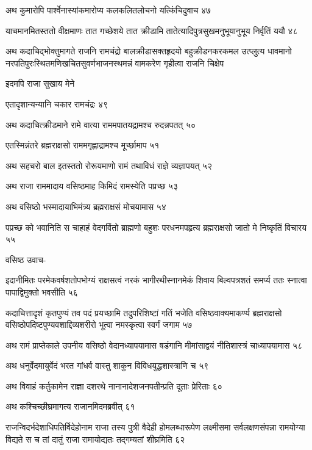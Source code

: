 अथ कुमारोपि पार्श्वेनास्यांकमारोप्य कलकलितलोचनो यत्किंचिदुवाच ४७

याचमानमितस्ततो वीक्षमाणः तात गच्छेशये तात क्रीडामि तातेत्यादिपुत्रसुखमनुभूयानुभूय
निर्वृतिं ययौ ४८

अथ कदाचिद्भोक्तुमागते राजनि रामचंद्रो बालक्रीडासक्तहृदयो बहुक्रीडनकरकमल उत्प्लुत्य
धावमानो नरपतिपुरःस्थितमणिखचितसुवर्णभाजनस्थमन्नं वामकरेण गृहीत्वा राजनि चिक्षेप

इदमपि राजा सुखाय मेने

एतादृशान्यन्यानि चकार रामचंद्रः ४९

अथ कदाचित्क्रीडमाने रामे वात्या राममपातयद्रामश्च रुदन्नपतत् ५०

एतस्मिन्नंतरे ब्रह्मराक्षसो राममगृह्णाद्रामश्च मूर्च्छामाप ५१

अथ सहचरो बाल इतस्ततो रोरूयमाणो रामं तथाविधं राज्ञे व्यज्ञापयत् ५२

अथ राजा राममादाय वसिष्ठमाह किमिदं रामस्येति पप्रच्छ ५३

अथ वसिष्ठो भस्मादायाभिमंत्र्य ब्रह्मराक्षसं मोचयामास ५४

पप्रच्छ को भवानिति स चाहाहं वेदगर्वितो ब्राह्मणो बहुशः परधनमपहृत्य ब्रह्मराक्षसो जातो
मे निष्कृतिं विचारय ५५

वसिष्ठ उवाच-

इदानीमितः परमेकवर्षशतोपभोग्यं राक्षसत्वं नरकं भागीरथीस्नानमेकं शिवाय बिल्वपत्रशतं
समर्प्य ततः स्नात्वा पापाद्विमुक्तो भवसीति ५६

कदाचित्तादृशं कृतपुण्यं तव पदं प्रयच्छामि तदुपरिशिष्टां गतिं भजेति वसिष्ठवाक्यमाकर्ण्य
ब्रह्मराक्षसो वसिष्ठोपदिष्टपुण्यवशाद्दिव्यशरीरो भूत्वा नमस्कृत्वा स्वर्गं जगाम ५७

अथ रामं प्राप्तेकाले उपनीय वसिष्ठो वेदानध्यापयामास षडंगानि मीमांसाद्वयं नीतिशास्त्रं
चाध्यापयामास ५८

अथ धनुर्वेदमायुर्वेदं भरत गांधर्व वास्तु शाकुन विविधयुद्धशास्त्राणि च ५९

अथ विवाहं कर्तुकामेन राज्ञा दशरथे नानानादेशजनपतीन्प्रति दूताः प्रेरिताः ६०

अथ कश्चिच्छीघ्रमागत्य राजानमिदमब्रवीत् ६१

राजन्विदर्भदेशाधिपतिर्विदेहोनाम राजा तस्य पुत्री वैदेही होमलब्धारूपेण लक्ष्मीसमा
सर्वलक्षणसंपन्ना रामयोग्या विद्यते स च तां दातुं राजा रामायोद्यतः तद्गम्यतां शीघ्रमिति
६२

